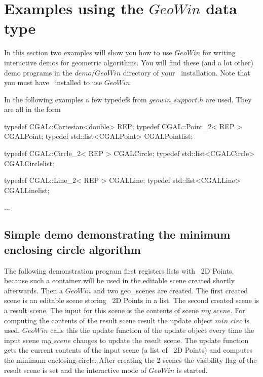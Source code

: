 \section{Examples using the $GeoWin$ data type}

In this section two examples will show you how to use $GeoWin$ for writing interactive 
demos for geometric algorithms. You will find these (and a lot other) demo programs in the
$demo/GeoWin$ directory of your \cgal\ installation. Note that you must have \leda\ installed
to use $GeoWin$.

In the following examples a few typedefs from $geowin\_support.h$ are used.
They are all in the form

\begin{cprog}
typedef CGAL::Cartesian<double>  REP;
typedef CGAL::Point_2< REP >     CGALPoint;
typedef std::list<CGALPoint>     CGALPointlist;

typedef CGAL::Circle_2< REP >    CGALCircle;
typedef std::list<CGALCircle>    CGALCirclelist;

typedef CGAL::Line_2< REP >      CGALLine;
typedef std::list<CGALLine>      CGALLinelist;

...

\end{cprog}

\subsection{Simple demo demonstrating the minimum enclosing circle algorithm}

The following demonstration program first registers lists with \cgal\ 2D Points, because such a container
will be used in the editable scene created shortly afterwards.
Then a $GeoWin$ and two geo\_scenes are created.
The first created scene is an editable scene storing \cgal\ 2D Points in a list. The second created scene
is a result scene. The input for this scene is the contents of scene $my\_scene$. For computing the contents
of the result scene result the update object $min\_circ$ is used. $GeoWin$ calls this the update function 
of the update object every time the input scene $my\_scene$ changes to update the result scene.
The update function gets the current contents of the input scene (a list of \cgal\ 2D Points) and
computes the minimum enclosing circle.
After creating the 2 scenes the visibility flag of the result scene is set and the interactive mode
of $GeoWin$ is started.

